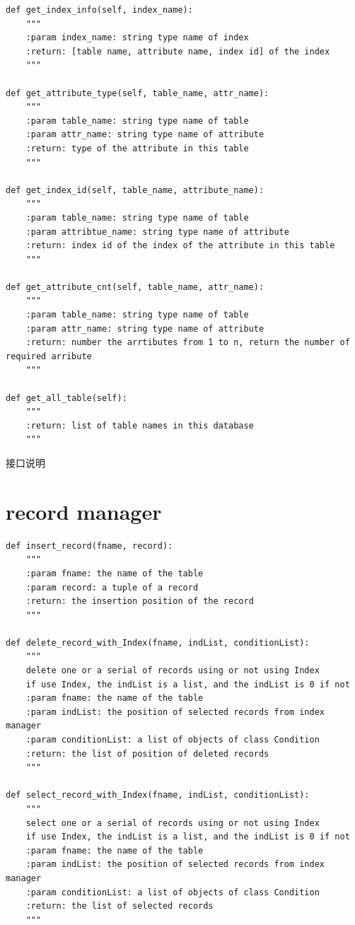 \documentclass[UTF8]{ctexrep} %
\newenvironment{longlisting}{\captionsetup{type=listing}}{}
\begin{document}
\begin{appendices}
\begin{longlisting}
\begin{verbatim}
def get_index_info(self, index_name):
    """
    :param index_name: string type name of index
    :return: [table name, attribute name, index id] of the index
    """

def get_attribute_type(self, table_name, attr_name):
    """
    :param table_name: string type name of table
    :param attr_name: string type name of attribute
    :return: type of the attribute in this table
    """

def get_index_id(self, table_name, attribute_name):
    """
    :param table_name: string type name of table
    :param attribtue_name: string type name of attribute
    :return: index id of the index of the attribute in this table
    """

def get_attribute_cnt(self, table_name, attr_name):
    """
    :param table_name: string type name of table
    :param attr_name: string type name of attribute
    :return: number the arrtibutes from 1 to n, return the number of required arribute
    """

def get_all_table(self):
    """
    :return: list of table names in this database
    """
    \end{verbatim}
    \caption{接口说明}
    \label{lst:interface_specification}
\end{longlisting}

\section{record manager}
\begin{longlisting}
    \begin{verbatim}
def insert_record(fname, record):
    """
    :param fname: the name of the table
    :param record: a tuple of a record
    :return: the insertion position of the record
    """
    
def delete_record_with_Index(fname, indList, conditionList):
    """
    delete one or a serial of records using or not using Index
    if use Index, the indList is a list, and the indList is 0 if not
    :param fname: the name of the table
    :param indList: the position of selected records from index manager
    :param conditionList: a list of objects of class Condition
    :return: the list of position of deleted records
    """

def select_record_with_Index(fname, indList, conditionList):
    """
    select one or a serial of records using or not using Index
    if use Index, the indList is a list, and the indList is 0 if not
    :param fname: the name of the table
    :param indList: the position of selected records from index manager
    :param conditionList: a list of objects of class Condition
    :return: the list of selected records  
    """


\end{verbatim}
\end{longlisting}
\end{appendices}
\end{document}
